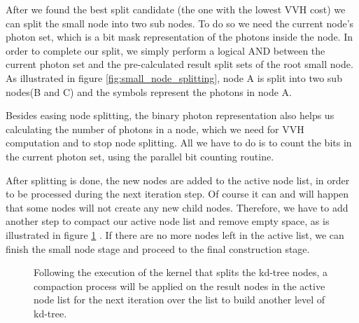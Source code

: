 After we found the best split candidate (the one with the lowest VVH cost) we can split the small node into two sub nodes. To do so we need the current node's photon set, which is a bit mask representation of the photons inside the node. In order to complete our split, we simply perform a logical AND between the current photon set and the pre-calculated result split sets of the root small node. As illustrated in figure \ref{fig:small_node_splitting}, node A is split into two sub nodes(B and C) and the symbols represent the photons in node A.

Besides easing node splitting, the binary photon representation also helps us calculating the number of photons in a node, which we need for VVH computation and to stop node splitting. All we have to do is to count the bits in the current photon set, using the parallel bit counting routine.

After splitting is done, the new nodes are added to the active node list, in order to be processed during the next iteration step. Of course it can and will happen that some nodes will not create any new child nodes. Therefore, we have to add another step to compact our active node list and remove empty space, as is illustrated in figure \ref{fig:compact_active_list} \cite{Lauterbach09fastbvh}. If there are no more nodes left in the active list, we can finish the small node stage and proceed to the final construction stage.

\begin{figure}[ftp]
    \centering
    \renewcommand{\thefigure}{\thechapter.\arabic{figure}}
    \caption[Compacting kd-tree nodes in the active node list for next iteration.]{Following the execution of the kernel that splits the kd-tree nodes, a compaction process will be applied on the result nodes in the active node list for the next iteration over the list to build another level of kd-tree.}
    \label{fig:compact_active_list}
\end{figure}

